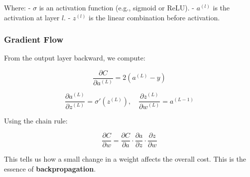 Where:
- $\sigma$ is an activation function (e.g., sigmoid or ReLU).
- $a^{(l)}$ is the activation at layer $l$.
- $z^{(l)}$ is the linear combination before activation.

\subsubsection*{Gradient Flow}

From the output layer backward, we compute:

\[
\frac{\partial C}{\partial a^{(L)}} = 2(a^{(L)} - y)
\]

\[
\frac{\partial a^{(L)}}{\partial z^{(L)}} = \sigma'(z^{(L)}), \quad \frac{\partial z^{(L)}}{\partial w^{(L)}} = a^{(L-1)}
\]

Using the chain rule:

\[
\frac{\partial C}{\partial w} = \frac{\partial C}{\partial a} \cdot \frac{\partial a}{\partial z} \cdot \frac{\partial z}{\partial w}
\]

This tells us how a small change in a weight affects the overall cost. This is the essence of \textbf{backpropagation}.
